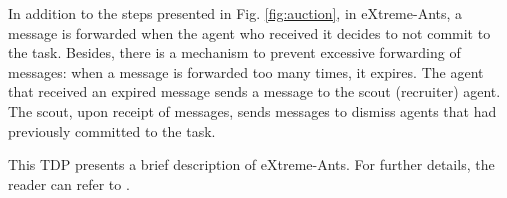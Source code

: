In addition to the steps presented in Fig. \ref{fig:auction}, in eXtreme-Ants, a  message is forwarded when the agent who received it decides to not commit to the task. Besides, there is a mechanism to prevent excessive forwarding of  messages: when a  message is forwarded too many times, it expires. The agent that received an expired  message sends a  message to the scout (recruiter) agent. The scout, upon receipt of  messages, sends  messages to dismiss agents that had previously committed to the task. 


This TDP presents a brief description of eXtreme-Ants. For further details, the reader can refer to \citep{Santos&Bazzan2009optmas}.


%


